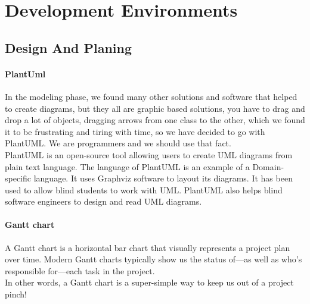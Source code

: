 \section{Development Environments}
\subsection{Design And Planing}

\paragraph*{PlantUml}
In the modeling phase, we found many other solutions and software that helped to create diagrams, but they all are graphic based solutions, you have to drag and drop a lot of objects, dragging arrows from one class to the other, which we found it to be frustrating and tiring with time, so we have decided to go with PlantUML. We are programmers and we should use that fact.\\
PlantUML is an open-source tool allowing users to create UML diagrams from plain text language. The language of PlantUML is an example of a Domain-specific language. It uses Graphviz software to layout its diagrams. It has been used to allow blind students to work with UML. PlantUML also helps blind software engineers to design and read UML diagrams.


\paragraph*{Gantt chart}
A Gantt chart is a horizontal bar chart that visually represents a project plan over time. Modern Gantt charts typically show us the status of—as well as who’s responsible for—each task in the project.\\

In other words, a Gantt chart is a super-simple way to keep us out of a project pinch!\\

